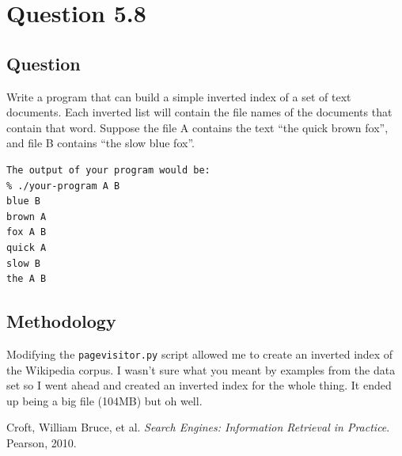 \documentclass[10pt,letterpaper,bibliography=totoc]{scrartcl}
\begin{document}
\section{Question 5.8}
\subsection{Question}
Write a program that can build a simple inverted index of a set of text documents. Each inverted list will contain the file names of the documents that contain that word.
Suppose the file A contains the text ``the quick brown fox'', and file B contains ``the slow blue fox''. 

\begin{verbatim}
The output of your program would be:
% ./your-program A B
blue B
brown A
fox A B
quick A
slow B
the A B
\end{verbatim}

\subsection{Methodology}
Modifying the \texttt{pagevisitor.py} script allowed me to create an inverted index of the Wikipedia corpus. I wasn't sure what you meant by examples from the data set so I went ahead and created an inverted index for the whole thing. It ended up being a big file (104MB) but oh well.

\clearpage
\begin{thebibliography}{9}
    Croft, William Bruce, et al. \textit{Search Engines: Information Retrieval in Practice}. Pearson, 2010.
\end{thebibliography}
\end{document}
